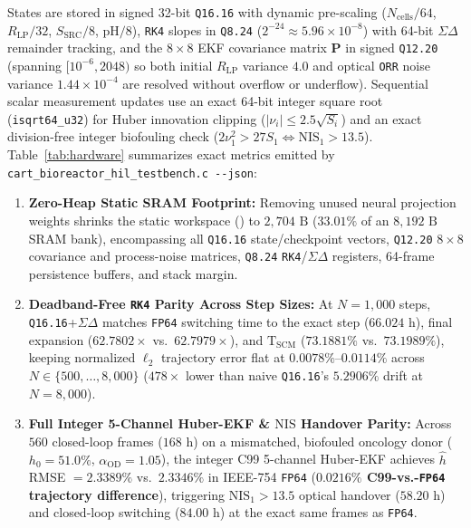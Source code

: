 \documentclass[11pt]{article}
\theoremstyle{plain}
\theoremstyle{remark}
\begin{document}
States are stored in signed 32-bit \texttt{Q16.16} with dynamic pre-scaling ($N_{\mathrm{cells}}/64$, $R_{\mathrm{LP}}/32$, $S_{\mathrm{SRC}}/8$, $\mathrm{pH}/8$), \texttt{RK4} slopes in \texttt{Q8.24} ($2^{-24} \approx 5.96 \times 10^{-8}$) with 64-bit $\Sigma\Delta$ remainder tracking, and the $8 \times 8$ EKF covariance matrix $\mathbf{P}$ in signed \texttt{Q12.20} (spanning $[10^{-6}, 2048)$ so both initial $R_{\mathrm{LP}}$ variance $4.0$ and optical \texttt{ORR} noise variance $1.44 \times 10^{-4}$ are resolved without overflow or underflow). Sequential scalar measurement updates use an exact 64-bit integer square root (\texttt{isqrt64\_u32}) for Huber innovation clipping ($|\nu_i| \le 2.5\sqrt{S_i}$) and an exact division-free integer biofouling check ($2\nu_1^2 > 27 S_1 \iff \mathrm{NIS}_1 > 13.5$). Table~\ref{tab:hardware} summarizes exact metrics emitted by \texttt{cart\_bioreactor\_hil\_testbench.c -\/-json}:
\begin{enumerate}
  \item \textbf{Zero-Heap Static SRAM Footprint:} Removing unused neural projection weights shrinks the static workspace () to $2{,}704\text{ B}$ ($33.01\%$ of an $8{,}192\text{ B}$ SRAM bank), encompassing all \texttt{Q16.16} state/checkpoint vectors, \texttt{Q12.20} $8 \times 8$ covariance and process-noise matrices, \texttt{Q8.24} \texttt{RK4}/$\Sigma\Delta$ registers, 64-frame persistence buffers, and stack margin.
  \item \textbf{Deadband-Free \texttt{RK4} Parity Across Step Sizes:} At $N = 1{,}000$ steps, \texttt{Q16.16}+$\Sigma\Delta$ matches \texttt{FP64} switching time to the exact step ($66.024\text{ h}$), final expansion ($62.7802\times$ vs.\ $62.7979\times$), and $\mathrm{T}_{\mathrm{SCM}}$ ($73.1881\%$ vs.\ $73.1989\%$), keeping normalized $\ell_2$ trajectory error flat at \textbf{$0.0078\%\text{--}0.0114\%$} across $N \in \{500, \dots, 8{,}000\}$ ($478\times$ lower than naive \texttt{Q16.16}'s $5.2906\%$ drift at $N = 8{,}000$).
  \item \textbf{Full Integer 5-Channel Huber-EKF \& $\mathrm{NIS}$ Handover Parity:} Across $560$ closed-loop frames ($168\text{ h}$) on a mismatched, biofouled oncology donor ($h_0 = 51.0\%$, $\alpha_{\mathrm{OD}} = 1.05$), the integer C99 5-channel Huber-EKF achieves $\hat{h}$ RMSE $= 2.3389\%$ vs.\ $2.3346\%$ in IEEE-754 \texttt{FP64} (\textbf{$0.0216\%$ C99-vs.-\texttt{FP64} trajectory difference}), triggering $\mathrm{NIS}_1 > 13.5$ optical handover ($58.20\text{ h}$) and closed-loop switching ($84.00\text{ h}$) at the exact same frames as \texttt{FP64}.
\end{enumerate}
\end{document}
